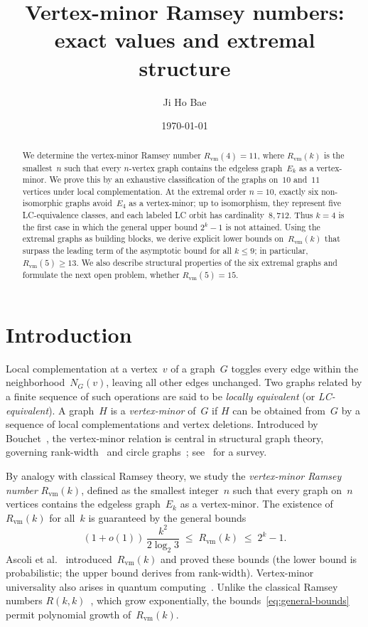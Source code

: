 \documentclass[11pt]{amsart}
\title[Vertex-minor Ramsey numbers]{Vertex-minor Ramsey numbers:\\ exact values and extremal structure}
\author{Ji Ho Bae}
\date{\today}
\theoremstyle{definition}
\theoremstyle{remark}
\newcommand{\Rvm}{R_{\mathrm{vm}}}
\begin{document}
\begin{abstract}
We determine the vertex-minor Ramsey number $\Rvm(4)=11$, where
$\Rvm(k)$ is the smallest~$n$ such that every $n$-vertex graph contains
the edgeless graph~$E_k$ as a vertex-minor.  We prove this by an
exhaustive classification of the graphs on~$10$ and~$11$ vertices under
local complementation.  At the extremal order $n=10$, exactly six
non-isomorphic graphs avoid~$E_4$ as a vertex-minor; up to isomorphism,
they represent five LC-equivalence classes, and each labeled LC orbit
has cardinality~$8{,}712$.  Thus $k=4$ is the first case in which the
general upper bound $2^k-1$ is not attained.  Using the extremal graphs
as building blocks, we derive explicit lower bounds on~$\Rvm(k)$ that
surpass the leading term of the asymptotic bound for all $k\leq 9$; in
particular,
$\Rvm(5)\geq 13$.  We also describe structural properties of the six
extremal graphs and formulate the next open problem, whether
$\Rvm(5)=15$.
\end{abstract}

\maketitle

\section{Introduction}\label{sec:intro}

Local complementation at a vertex~$v$ of a graph~$G$ toggles every edge
within the neighborhood~$N_G(v)$, leaving all other edges unchanged.
Two graphs related by a finite sequence of such operations are said to
be \emph{locally equivalent} (or \emph{LC-equivalent}).  A graph~$H$ is
a \emph{vertex-minor} of~$G$ if $H$ can be obtained from~$G$ by a
sequence of local complementations and vertex deletions.  Introduced by
Bouchet~\cite{Bouchet1988}, the vertex-minor relation
is central in structural graph theory, governing rank-width~\cite{Oum2005}
and circle graphs~\cite{Bouchet1994}; see~\cite{KimOum2024} for a survey.

By analogy with classical Ramsey theory, we study the
\emph{vertex-minor Ramsey number} $\Rvm(k)$, defined as the smallest
integer~$n$ such that every graph on~$n$ vertices contains the edgeless
graph~$E_k$ as a vertex-minor.  The existence of~$\Rvm(k)$ for all~$k$
is guaranteed by the general bounds
\begin{equation}\label{eq:general-bounds}
  (1+o(1))\,\frac{k^2}{2\log_2 3}
  \;\leq\;
  \Rvm(k)
  \;\leq\;
  2^k - 1.
\end{equation}
Ascoli et al.~\cite{AFFMP2026} introduced~$\Rvm(k)$ and proved
these bounds (the lower bound is probabilistic; the upper bound derives
from rank-width).  Vertex-minor universality also arises in quantum
computing~\cite{CautresEtAl2024,ChaoXu2026}.  Unlike the classical Ramsey numbers
$R(k,k)$~\cite{GRS1990,Radziszowski2026}, which grow exponentially,
the bounds~\eqref{eq:general-bounds} permit polynomial growth
of~$\Rvm(k)$.
\end{document}
